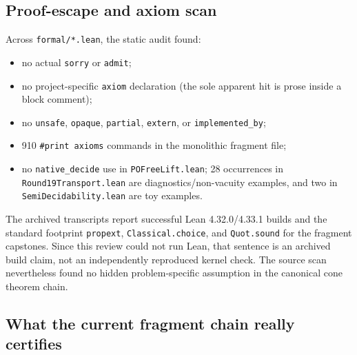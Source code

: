 \documentclass[11pt]{article}
\newcommand{\code}[1]{\texttt{#1}}
\begin{document}
\subsection{Proof-escape and axiom scan}

Across \code{formal/*.lean}, the static audit found:
\begin{itemize}
  \item no actual \code{sorry} or \code{admit};
  \item no project-specific \code{axiom} declaration (the sole apparent hit is
        prose inside a block comment);
  \item no \code{unsafe}, \code{opaque}, \code{partial}, \code{extern}, or
        \code{implemented\_by};
  \item 910 \code{\#print axioms} commands in the monolithic fragment file;
  \item no \code{native\_decide} use in \code{POFreeLift.lean}; 28 occurrences
        in \code{Round19Transport.lean} are diagnostics/non-vacuity examples,
        and two in \code{SemiDecidability.lean} are toy examples.
\end{itemize}
The archived transcripts report successful Lean 4.32.0/4.33.1 builds and the
standard footprint \code{propext}, \code{Classical.choice}, and
\code{Quot.sound} for the fragment capstones.  Since this review could not run
Lean, that sentence is an archived build claim, not an independently reproduced
kernel check.  The source scan nevertheless found no hidden problem-specific
assumption in the canonical cone theorem chain.

\subsection{What the current fragment chain really certifies}
\end{document}

